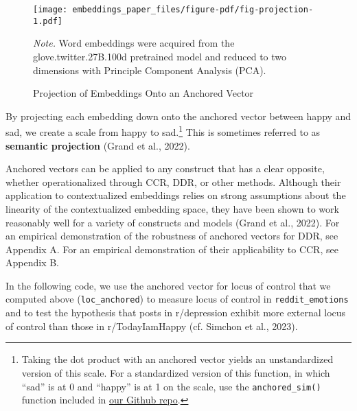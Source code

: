 \documentclass[
  man,
  floatsintext,
  longtable,
  nolmodern,
  notxfonts,
  notimes,
  colorlinks=true,linkcolor=blue,citecolor=blue,urlcolor=blue]{apa7}
\begin{document}
\begin{figure}[!htbp]

{\caption{{Projection of Embeddings Onto an Anchored
Vector}{\label{fig-projection}}}}

\texttt{[image: embeddings\_paper\_files/figure-pdf/fig-projection-1.pdf]}

{\noindent \emph{Note.} Word embeddings were acquired from the
glove.twitter.27B.100d pretrained model and reduced to two dimensions
with Principle Component Analysis (PCA).}

\end{figure}

By projecting each embedding down onto the anchored vector between happy
and sad, we create a scale from happy to sad.\footnote{Taking the dot
  product with an anchored vector yields an unstandardized version of
  this scale. For a standardized version of this function, in which
  ``sad'' is at 0 and ``happy'' is at 1 on the scale, use the
  \texttt{anchored\_sim()} function included in
  \href{https://github.com/rimonim/ds4psych/blob/master/vector_scripts.R}{our
  Github repo}.} This is sometimes referred to as \textbf{semantic
projection} (Grand et al., 2022).

Anchored vectors can be applied to any construct that has a clear
opposite, whether operationalized through CCR, DDR, or other methods.
Although their application to contextualized embeddings relies on strong
assumptions about the linearity of the contextualized embedding space,
they have been shown to work reasonably well for a variety of constructs
and models (Grand et al., 2022). For an empirical demonstration of the
robustness of anchored vectors for DDR, see Appendix A. For an empirical
demonstration of their applicability to CCR, see Appendix B.

In the following code, we use the anchored vector for locus of control
that we computed above (\texttt{loc\_anchored}) to measure locus of
control in \texttt{reddit\_emotions} and to test the hypothesis that
posts in r/depression exhibit more external locus of control than those
in r/TodayIamHappy (cf. Simchon et al., 2023).
\end{document}
